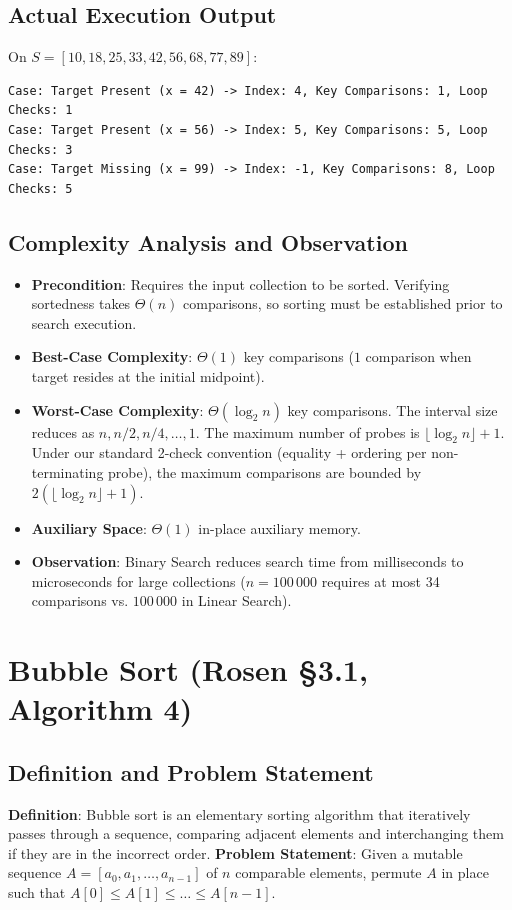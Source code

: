 \documentclass[11pt,a4paper,oneside]{report}
\theoremstyle{definition}
\begin{document}
\subsection{Actual Execution Output}
On $S = [10, 18, 25, 33, 42, 56, 68, 77, 89]$:
\begin{verbatim}
Case: Target Present (x = 42) -> Index: 4, Key Comparisons: 1, Loop Checks: 1
Case: Target Present (x = 56) -> Index: 5, Key Comparisons: 5, Loop Checks: 3
Case: Target Missing (x = 99) -> Index: -1, Key Comparisons: 8, Loop Checks: 5
\end{verbatim}

\subsection{Complexity Analysis and Observation}
\begin{itemize}
    \item \textbf{Precondition}: Requires the input collection to be sorted. Verifying sortedness takes $\Theta(n)$ comparisons, so sorting must be established prior to search execution.
    \item \textbf{Best-Case Complexity}: $\Theta(1)$ key comparisons ($1$ comparison when target resides at the initial midpoint).
    \item \textbf{Worst-Case Complexity}: $\Theta(\log_2 n)$ key comparisons. The interval size reduces as $n, n/2, n/4, \dots, 1$. The maximum number of probes is $\lfloor \log_2 n \rfloor + 1$. Under our standard 2-check convention (equality + ordering per non-terminating probe), the maximum comparisons are bounded by $2(\lfloor \log_2 n \rfloor + 1)$.
    \item \textbf{Auxiliary Space}: $\Theta(1)$ in-place auxiliary memory.
    \item \textbf{Observation}: Binary Search reduces search time from milliseconds to microseconds for large collections ($n = 100\,000$ requires at most 34 comparisons vs. $100\,000$ in Linear Search).
\end{itemize}

\newpage
\section{Bubble Sort (Rosen \S3.1, Algorithm 4)}

\subsection{Definition and Problem Statement}
\textbf{Definition}: Bubble sort is an elementary sorting algorithm that iteratively passes through a sequence, comparing adjacent elements and interchanging them if they are in the incorrect order.
\textbf{Problem Statement}: Given a mutable sequence $A = [a_0, a_1, \dots, a_{n-1}]$ of $n$ comparable elements, permute $A$ in place such that $A[0] \le A[1] \le \dots \le A[n-1]$.
\end{document}
